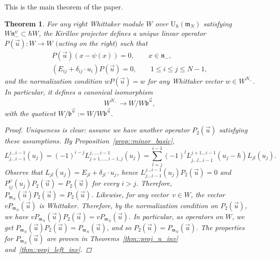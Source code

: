 \documentclass[10pt,a4paper]{article}
\numberwithin{equation}{section}
\newtheorem{Theorem}{Theorem}[section]
\newcommand{\U}{\mathrm{U}_{\hbar}}
\renewcommand{\b}{\mathfrak{b}}
\newcommand{\n}{\mathfrak{n}}
\newcommand{\m}{\mathfrak{m}}
\begin{document}
	This is the main theorem of the paper.
	\begin{Theorem}
		\label{thm::main_thm}
		For any right Whittaker module $W$ over $\U(\m_N)$ satisfying $W\n_-^{\psi} \subset \hbar W$, the Kirillov projector defines a unique linear operator $P(\vec{u})\colon W \rightarrow W$ $($acting on the right$)$ such that
		\begin{gather*}
			P(\vec{u}) (x-\psi(x)) = 0,\qquad x\in \n_-, \\
			(E_{ij} + \delta_{ij}\cdot u_i) P(\vec{u}) = 0,\qquad 1\leq i \leq j \leq N-1,
		\end{gather*}
		and the normalization condition
		$
		w P(\vec{u}) = w
		$
		for any Whittaker vector $w\in W^{N_-}$. In particular, it defines a canonical isomorphism
		\begin{equation}
			\label{eq::kirillov_proj_iso_inv_quot}
			W^{N_-} \rightarrow W/ W \b^{\vec{u}},
		\end{equation}
		with the quotient $W/\b^{\vec{u}} := W/ W\b^{\vec{u}}$.
		\begin{proof}
			Uniqueness is clear: assume we have another operator $P_2(\vec{u})$ satisfying these assumptions. By Proposition~\ref{prop::minor_basic},
			\[
			L_{j\dots i-1}^{j \dots i-1}(u_{j}) = (-1)^{i-j} L_{j+1,\dots,i-1,j}^{j,\dots,i-1}(u_j) = \sum\limits_{l=j}^{i-1} (-1)^{l} L_{j\dots \hat{l} \dots i-1}^{j+1 \dots i-1}(u_j-\hbar) L_{jl}(u_j).
			\]
			Observe that $L_{jl}(u_j) = E_{jl} + \delta_{jl}\cdot u_j$, hence $L_{j\dots i-1}^{j\dots i-1}(u_j) P_2 (\vec{u}) = 0$ and
$
			P_{ij}^{\psi}(u_j) P_2(\vec{u}) = P_2(\vec{u})
$
			for every $i > j$. Therefore,
$
			P_{\m_N}(\vec{u}) P_2(\vec{u}) = P_2(\vec{u})$.
			Likewise, for any vector~$v\in W$, the vector $v P_{\m_N}(\vec{u})$ is Whittaker. Therefore, by the normalization condition on $P_2(\vec{u})$, we have
$
			vP_{\m_N}(\vec{u}) P_2(\vec{u}) = vP_{\m_N}(\vec{u})$.
			In particular, as operators on $W$, we get
$
			P_{\m_N}(\vec{u}) P_2(\vec{u}) = P_{\m_N}(\vec{u})$,
			and so
			$
			P_2(\vec{u}) = P_{\m_N}(\vec{u})$.
			The properties for $P_{\m_N}(\vec{u})$ are proven in Theorems~\ref{thm::proj_n_inv} and~\ref{thm::proj_left_inv}.
		\end{proof}
	\end{Theorem}
	
\end{document}
